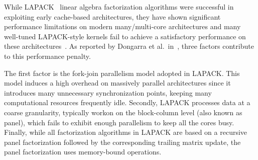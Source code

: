 While LAPACK~\cite{anderson1999lapack} linear algebra factorization
algorithms were successful in exploiting early cache-based
architectures, they have shown significant performance
limitations on modern many/multi-core architectures and many
well-tuned LAPACK-style kernels
fail to achieve a satisfactory performance on these
architectures~\cite{agullo2009comparative}.
As reported by Dongarra et al\@.~in~\cite{dongarra2011achieving},
three factors contribute to this
performance penalty.

The first factor is the fork-join parallelism
model adopted in LAPACK. This model induces a high overhead on
massively parallel architectures since it introduces many unnecessary
synchronization points, keeping many computational resources frequently
idle.
Secondly, LAPACK processes data at a coarse granularity,
typically workon on the block-column level (also known as panel),
which fails to exhibit enough parallelism to
keep all the cores busy.
Finally, while all factorization algorithms in LAPACK are based on
a recursive panel factorization followed by the corresponding trailing
matrix update, the panel factorization uses memory-bound operations.

